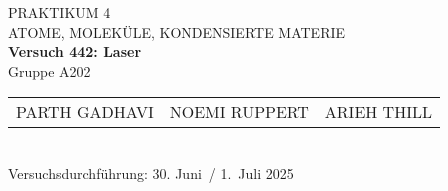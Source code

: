 \documentclass[%
paper=a4,       %
fontsize=11pt,  %
ngerman         %
]{scrreprt}
\begin{document}
\begin{titlepage}
  \centering
  \vspace*{2cm}
  
  {\Large PRAKTIKUM 4}\\[0.5cm]
  {\large ATOME, MOLEKÜLE, KONDENSIERTE MATERIE}\\[1cm]
  
  {\LARGE\bfseries Versuch 442: Laser}\\[1cm]
  
  Gruppe A202\\[1cm]
  
  \begin{tabular}{lll}
    PARTH GADHAVI   & NOEMI RUPPERT   & ARIEH THILL \\
  \end{tabular}\\[2cm]
  
  Versuchsdurchführung: 30. Juni~/ 1.~Juli 2025
  
  \vfill
\end{titlepage}

\tableofcontents
\clearpage
\clearpage
\setcounter{page}{1}
 
 
 
 
 
 
 

\appendix
\printbibliography{}
\end{document}
